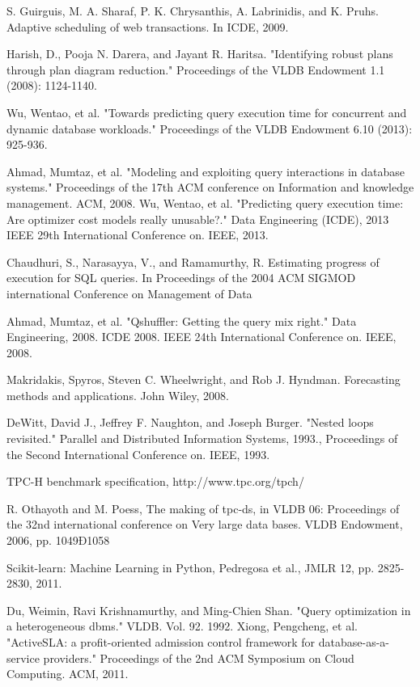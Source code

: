 \documentclass{article}
\begin{document}
\begin{multicols}{2}
\begin{thebibliography}{9}
     S. Guirguis, M. A. Sharaf, P. K. Chrysanthis, A. Labrinidis, and
	K. Pruhs. Adaptive scheduling of web transactions. In ICDE, 2009.
	
	Harish, D., Pooja N. Darera, and Jayant R. Haritsa. "Identifying robust plans through plan diagram 			reduction." Proceedings of the VLDB Endowment 1.1 (2008): 1124-1140.
	
	Wu, Wentao, et al. "Towards predicting query execution time for concurrent and dynamic database 			workloads." Proceedings of the VLDB Endowment 6.10 (2013): 925-936.
	
	Ahmad, Mumtaz, et al. "Modeling and exploiting query interactions in database systems." Proceedings of the 17th ACM conference on Information and knowledge management. ACM, 2008.
	Wu, Wentao, et al. "Predicting query execution time: Are optimizer cost models really unusable?." Data Engineering (ICDE), 2013 IEEE 29th International Conference on. IEEE, 2013.
	
	Chaudhuri, S., Narasayya, V., and Ramamurthy, R.
	Estimating progress of execution for SQL queries. In
	Proceedings of the 2004 ACM SIGMOD international
	Conference on Management of Data

	Ahmad, Mumtaz, et al. "Qshuffler: Getting the query mix right." Data Engineering, 2008. ICDE 2008. IEEE 24th International Conference on. IEEE, 2008.	
	
	Makridakis, Spyros, Steven C. Wheelwright, and Rob J. Hyndman. Forecasting methods and applications. John Wiley, 2008.
	
	DeWitt, David J., Jeffrey F. Naughton, and Joseph Burger. "Nested loops revisited." Parallel and Distributed Information Systems, 1993., Proceedings of the Second International Conference on. IEEE, 1993.
	
	TPC-H benchmark specification, http://www.tpc.org/tpch/
	
	R. Othayoth and M. Poess, The making of tpc-ds, in VLDB
	06: Proceedings of the 32nd international conference on Very
	large data bases. VLDB Endowment, 2006, pp. 1049Ð1058
	
	Scikit-learn: Machine Learning in Python, Pedregosa et al., JMLR 12, pp. 2825-2830, 2011.
	
	Du, Weimin, Ravi Krishnamurthy, and Ming-Chien Shan. "Query optimization in a heterogeneous dbms." 		VLDB. Vol. 92. 1992.
	Xiong, Pengcheng, et al. "ActiveSLA: a profit-oriented admission control framework for database-as-a-		service providers." Proceedings of the 2nd ACM Symposium on Cloud Computing. ACM, 2011.	
	
	\end{thebibliography}
	\end{multicols}
\end{document}
